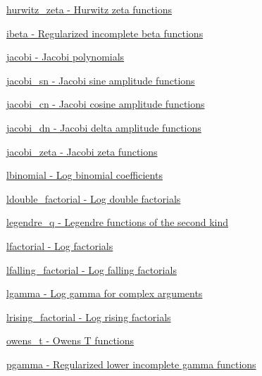 \begin{DoxyItemize}
\item \hyperlink{group__gnu__math__spec__func_ga19b3014d94dd102c59a5c7776474be41}{hurwitz\+\_\+zeta -\/ Hurwitz zeta functions}
\item \hyperlink{group__gnu__math__spec__func_gae9a18423e325171ca0c61b411258fa65}{ibeta -\/ Regularized incomplete beta functions}
\item \hyperlink{group__gnu__math__spec__func_ga3dea9ec3774ee5db50276597bbfb0afa}{jacobi -\/ Jacobi polynomials}
\item \hyperlink{group__gnu__math__spec__func_ga5e39ec723669e132e27980dfdf766c19}{jacobi\+\_\+sn -\/ Jacobi sine amplitude functions}
\item \hyperlink{group__gnu__math__spec__func_ga51512996a910489b4554daa7507a48f1}{jacobi\+\_\+cn -\/ Jacobi cosine amplitude functions}
\item \hyperlink{group__gnu__math__spec__func_ga4c2e5ff17abaab5217d4dbcbfd7366d8}{jacobi\+\_\+dn -\/ Jacobi delta amplitude functions}
\item \hyperlink{group__gnu__math__spec__func_gafe1fc209cfe90ceee3b42e077a922045}{jacobi\+\_\+zeta -\/ Jacobi zeta functions}
\item \hyperlink{group__gnu__math__spec__func_ga40d19a09e31feb1ee619e11780113c58}{lbinomial -\/ Log binomial coefficients}
\item \hyperlink{group__gnu__math__spec__func_ga31ca8e7a5b1f5c883e727ed9c053edd8}{ldouble\+\_\+factorial -\/ Log double factorials}
\item \hyperlink{group__gnu__math__spec__func_ga4ad68133a4ff354cb99e4d3608ce6e4d}{legendre\+\_\+q -\/ Legendre functions of the second kind}
\item \hyperlink{group__gnu__math__spec__func_gaee28cc03db944a3e02fd10542016cfa8}{lfactorial -\/ Log factorials}
\item \hyperlink{group__gnu__math__spec__func_ga7190df10af767718f1862e804a2d7129}{lfalling\+\_\+factorial -\/ Log falling factorials}
\item \hyperlink{group__gnu__math__spec__func_ga3a5c8ad2a513470bd71be1bb14439945}{lgamma -\/ Log gamma for complex arguments}
\item \hyperlink{group__gnu__math__spec__func_ga86158caf7d3e8b439599a12953af9844}{lrising\+\_\+factorial -\/ Log rising factorials}
\item \hyperlink{group__gnu__math__spec__func_gaa6ca4f2127c6c2101dc360673304cc2c}{owens\+\_\+t -\/ Owens T functions}
\item \hyperlink{group__gnu__math__spec__func_gaa78927de2c62e6c63f4b3506f5e1a8f6}{pgamma -\/ Regularized lower incomplete gamma functions}

\end{DoxyItemize}
